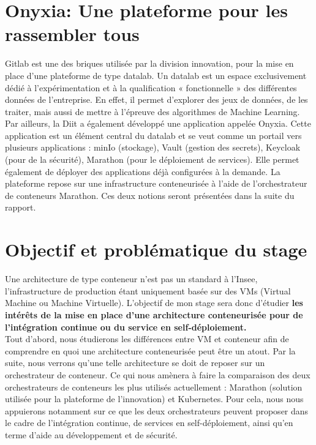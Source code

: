 \documentclass[11pt,fleqn]{book} %
\begin{document}
\section{Onyxia: Une plateforme pour les rassembler tous}
Gitlab est une des briques utilisée par la division innovation, pour la mise en place d'une plateforme de type datalab. Un datalab est un espace exclusivement dédié à l’expérimentation et à la qualification « fonctionnelle » des différentes données de l’entreprise. En effet, il permet d’explorer des jeux de données, de les traiter, mais aussi de mettre à l’épreuve des algorithmes de Machine Learning.\\


Par ailleurs, la Diit a également développé une application appelée Onyxia. Cette application est un élément central du datalab et se veut comme un portail vers plusieurs applications : minIo (stockage), Vault (gestion des secrets), Keycloak (pour de la sécurité), Marathon (pour le déploiement de services). Elle permet également de déployer des applications déjà configurées à la demande. La plateforme repose sur une infrastructure conteneurisée à l'aide de l'orchestrateur de conteneurs Marathon. Ces deux notions seront présentées dans la suite du rapport. 



\section{Objectif et problématique du stage}
Une architecture de type conteneur n'est pas un standard à l'Insee, l'infrastructure de production étant uniquement basée sur des VMs (Virtual Machine ou Machine Virtuelle). L'objectif de mon stage sera donc d'étudier \textbf{les intérêts de la mise en place d'une architecture conteneurisée pour de l'intégration continue ou du service en self-déploiement.}\\

Tout d'abord, nous étudierons les différences entre VM et conteneur afin de comprendre en quoi une architecture conteneurisée peut être un atout. Par la suite, nous verrons qu'une telle architecture se doit de reposer sur un orchestrateur de conteneur. Ce qui nous amènera à faire la comparaison des deux orchestrateurs de conteneurs les plus utilisés actuellement : Marathon (solution utilisée pour la plateforme de l'innovation) et Kubernetes. Pour cela, nous nous appuierons notamment sur ce que les deux orchestrateurs peuvent proposer dans le cadre de l'intégration continue, de services en self-déploiement, ainsi qu'en terme d'aide au développement et de sécurité.
\end{document}
